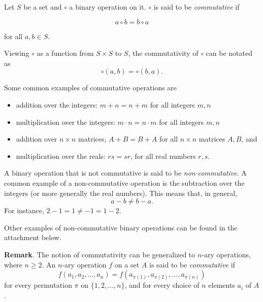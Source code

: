 \documentclass[12pt]{article}
\begin{document}
Let $S$ be a set and $\circ$ a binary operation on it.  $\circ$ is said to be \emph{commutative} if

$$a \circ b = b \circ a$$

for all $a,b \in S$.

Viewing $\circ$ as a function from $S\times S$ to $S$, the commutativity of $\circ$ can be notated as $$\circ(a,b)=\circ(b,a).$$

Some common examples of commutative operations are 
\begin{itemize}
\item addition over the integers: $m+n=n+m$ for all integers $m,n$
\item multiplication over the integers: $m\cdot n=n\cdot m$ for all integers $m,n$
\item addition over $n \times n$ matrices, $A+B=B+A$ for all $n\times n$ matrices $A,B$, and
\item multiplication over the reals: $rs=sr$, for all real numbers $r,s$.
\end{itemize}

A binary operation that is not commutative is said to be \emph{non-commutative}.  A common example of a non-commutative operation is the subtraction over the integers (or more generally the real numbers).  This means that, in general, $$a-b\ne b-a.$$  For instance, $2-1=1\ne -1 = 1-2$.

Other examples of non-commutative binary operations can be found in the attachment below.

\textbf{Remark}.  The notion of commutativity can be generalized to $n$-ary operations, where $n\ge 2$.  An $n$-ary operation $f$ on a set $A$ is said to be \emph{commutative} if 
$$f(a_1,a_2,\ldots, a_n)=f(a_{\pi(1)},a_{\pi(2)},\ldots, a_{\pi(n)})$$ 
for every permutation $\pi$ on $\lbrace 1,2,\ldots, n\rbrace$, and for every choice of $n$ elements $a_i$ of $A$.
\end{document}
